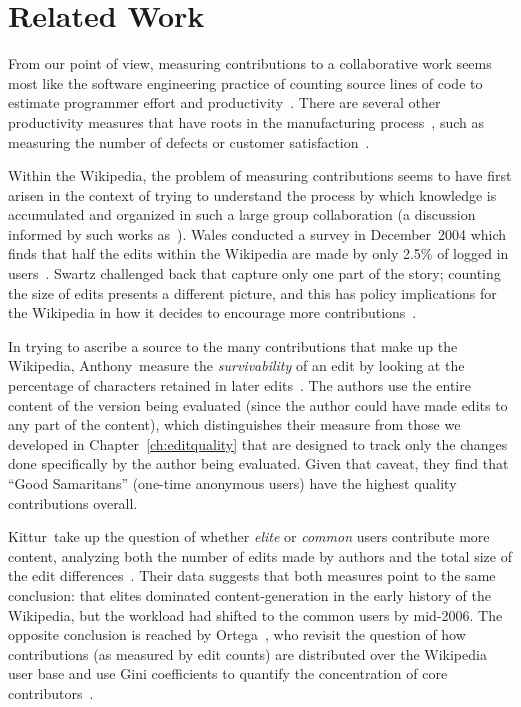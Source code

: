 \section{Related Work}

From our point of view, measuring contributions to a collaborative
work seems most like the software engineering practice of counting
source lines of code to estimate programmer effort and
productivity~\cite{Schultz1988,Park1992}.
There are several other productivity measures that have
roots in the manufacturing process~\cite{Diewart2005},
such as measuring the number of defects or customer
satisfaction~\cite{Tennant2001}.

Within the Wikipedia, the problem of measuring contributions
seems to have first arisen in the context of trying to understand
the process by which knowledge is accumulated and organized
in such a large group collaboration (a discussion informed
by such works
as~\cite{Butler2002,Benkler2002,Surowiecki2004,Reagle2004}).
Wales conducted a survey in December~2004 which finds that half
the edits within the Wikipedia are made by only 2.5\% of logged
in users~\cite{Wales2005}.
Swartz challenged back that  capture only one part of the
story; counting the size of edits presents a different picture,
and this has policy implications for the Wikipedia in how
it decides to encourage more contributions~\cite{Swartz2006}.

In trying to ascribe a source to the many contributions
that make up the Wikipedia, Anthony~\etal measure the
\textit{survivability} of an edit by looking at the percentage of
characters retained in later edits~\cite{Anthony2005}.
The authors use the entire content of the version being
evaluated (since the author could have made edits to any
part of the content), which distinguishes their measure
from those we developed in Chapter~\ref{ch:editquality}
that are designed to track only the changes done specifically
by the author being evaluated.
Given that caveat, they find that ``Good Samaritans'' (one-time
anonymous users) have the highest quality contributions overall.

Kittur~\etal take up the question of whether \textit{elite}
or \textit{common} users contribute more content, analyzing both
the number of edits made by authors and the total size of the
edit differences~\cite{Kittur2007}.
Their data suggests that both measures point to the same
conclusion: that elites dominated content-generation in the early
history of the Wikipedia, but the workload had shifted to
the common users by mid-2006.
The opposite conclusion is reached by Ortega~\etal,
who revisit the question of how contributions (as measured by
edit counts) are distributed over the Wikipedia user base and use
Gini coefficients to quantify the concentration of
core contributors~\cite{Ortega2008}.


